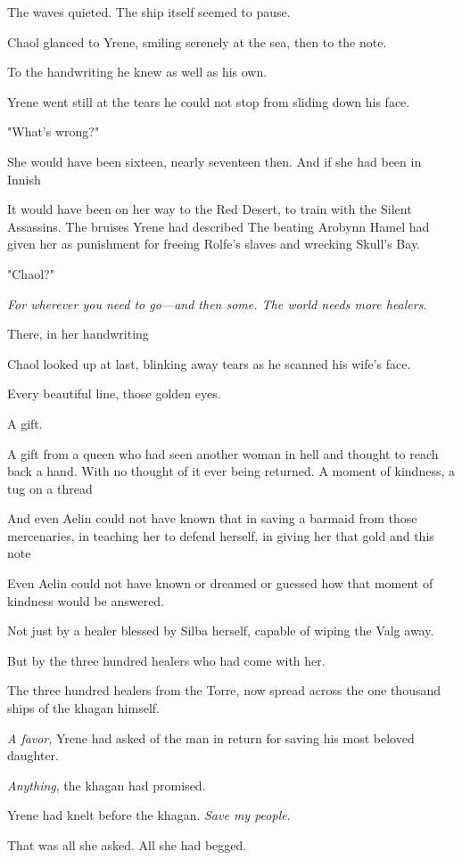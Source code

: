 The waves quieted. The ship itself seemed to pause.

Chaol glanced to Yrene, smiling serenely at the sea, then to the note.

To the handwriting he knew as well as his own.

Yrene went still at the tears he could not stop from sliding down his face.

"What's wrong?"

She would have been sixteen, nearly seventeen then. And if she had been in Innish 

It would have been on her way to the Red Desert, to train with the Silent Assassins. The bruises Yrene had described  The beating Arobynn Hamel had given her as punishment for freeing Rolfe's slaves and wrecking Skull's Bay.

"Chaol?"

\emph{For wherever you need to go---and then some. The world needs more healers}.

There, in her handwriting 

Chaol looked up at last, blinking away tears as he scanned his wife's face.

Every beautiful line, those golden eyes.

A gift.

A gift from a queen who had seen another woman in hell and thought to reach back a hand. With no thought of it ever being returned. A moment of kindness, a tug on a thread 

And even Aelin could not have known that in saving a barmaid from those mercenaries, in teaching her to defend herself, in giving her that gold and this note 

Even Aelin could not have known or dreamed or guessed how that moment of kindness would be answered.

Not just by a healer blessed by Silba herself, capable of wiping the Valg away.

But by the three hundred healers who had come with her.

The three hundred healers from the Torre, now spread across the one thousand ships of the khagan himself.

\emph{A favor}, Yrene had asked of the man in return for saving his most beloved daughter.

\emph{Anything}, the khagan had promised.

Yrene had knelt before the khagan. \emph{Save my people}.

That was all she asked. All she had begged.

